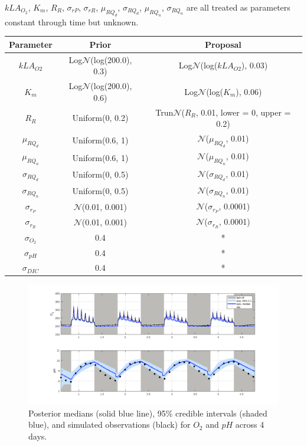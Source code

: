 \documentclass{ruthesis}
\begin{document}
$kLA_{O_2}$, $K_m$, $R_R$, $\sigma_{rP}$, $\sigma_{rR}$, $\mu_{RQ_d}$, $\sigma_{RQ_d}$, $\mu_{RQ_n}$, $\sigma_{RQ_n}$ are all treated as parameters constant through time but unknown. 


\begin{tabular}{c | c  |  c}
	\hline
	\bfseries{Parameter} & \bfseries{Prior} &  \bfseries{Proposal} \\ \hline
	$kLA_{O2}$  & Log$\mathcal{N}$(log(200.0), 0.3)  & Log$\mathcal{N}$(log($kLA_{O2}$), 0.03) \\
	$K_m$ 		&  Log$\mathcal{N}$(log(200.0), 0.6) & Log$\mathcal{N}$(log($K_m$), 0.06) \\
	$R_R$  		& Uniform(0, 0.2) &  Trun$\mathcal{N}$($R_R$, 0.01, lower = 0, upper = 0.2) \\
	$\mu_{RQ_d}$  	& Uniform(0.6, 1) &  $\mathcal{N}$($\mu_{RQ_d}$, 0.01)\\
	$\mu_{RQ_n}$  	& Uniform(0.6, 1) &  $\mathcal{N}$($\mu_{RQ_n}$, 0.01)\\
	$\sigma_{RQ_d}$ & Uniform(0, 0.5) &  $\mathcal{N}$($\sigma_{RQ_d}$, 0.01)\\
	$\sigma_{RQ_n}$ & Uniform(0, 0.5) &  $\mathcal{N}$($\sigma_{RQ_n}$, 0.01)\\
	$\sigma_{r_P}$ & $\mathcal{N}$(0.01, 0.001)   & $\mathcal{N}$($\sigma_{r_P}$, 0.0001)   \\
	$\sigma_{r_R}$ & $\mathcal{N}$(0.01, 0.001)   & $\mathcal{N}$($\sigma_{r_R}$, 0.0001)   \\
	$\sigma_{O_2}$ 	& 0.4	& *  \\
	$\sigma_{pH}$ 	& 0.4 	& * \\
	$\sigma_{DIC}$ 	& 0.4	& * \\	
\end{tabular}



\begin{figure}
	\centerline{\includegraphics[width=1.2\textwidth]{images_microalgae/plots_iterative/O2_pH}}
	\caption[.]{Posterior medians (solid blue line), 95\% credible intervals (shaded blue), and simulated observations (black) for $O_2$ and $pH$ across 4 days.}
	\label{fig:micro_exp_iterative_O2_pH}
\end{figure}
\end{document}
